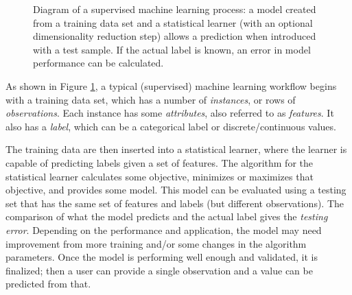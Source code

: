 \begin{figure}[!htb]
  \caption{Diagram of a supervised machine learning process: a model 
           created from a training data set and a statistical learner (with
           an optional dimensionality reduction step) allows a prediction
           when introduced with a test sample. If the actual label is known,
           an error in model performance can be calculated.}
  \label{fig:supervised}
\end{figure}

As shown in Figure \ref{fig:supervised}, a typical (supervised) machine
learning workflow begins with a training data set, which has a number of
\textit{instances}, or rows of \textit{observations}.  Each instance has some
\textit{attributes}, also referred to as \textit{features}. It also has a
\textit{label}, which can be a categorical label or discrete/continuous values.  

The training data are then inserted into a statistical learner, where the
learner is capable of predicting labels given a set of features. The algorithm
for the statistical learner calculates some objective, minimizes or maximizes
that objective, and provides some model.  This model can be evaluated using a
testing set that has the same set of features and labels (but different
observations). The comparison of what the model predicts and the actual label
gives the \textit{testing error}.  Depending on the performance and
application, the model may need improvement from more training and/or some
changes in the algorithm parameters. Once the model is performing well enough
and validated, it is finalized; then a user can provide a single observation
and a value can be predicted from that. 

